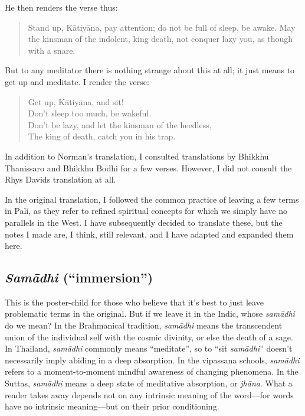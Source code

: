\documentclass[12pt,openany]{book}%
\begin{document}
He then renders the verse thus:

\begin{quotation}%
Stand up, \textsanskrit{Kātiyāna}, pay attention; do not be full of sleep, be awake. May the kinsman of the indolent, king death, not conquer lazy you, as though with a snare.

%
\end{quotation}

But to any meditator there is nothing strange about this at all; it just means to get up and meditate. I render the verse:

\begin{quotation}%
Get up, \textsanskrit{Kātiyāna}, and sit!\\

Don’t sleep too much, be wakeful.\\

Don’t be lazy, and let the kinsman of the heedless,\\

The king of death, catch you in his trap.

%
\end{quotation}

In addition to Norman’s translation, I consulted translations by Bhikkhu Thanissaro and Bhikkhu Bodhi for a few verses. However, I did not consult the Rhys Davids translation at all.

In the original translation, I followed the common practice of leaving a few terms in Pali, as they refer to refined spiritual concepts for which we simply have no parallels in the West. I have subsequently decided to translate these, but the notes I made are, I think, still relevant, and I have adapted and expanded them here.

\subsection*{\textit{\textsanskrit{Samādhi}} (“immersion”)}

This is the poster-child for those who believe that it’s best to just leave problematic terms in the original. But if we leave it in the Indic, whose \textit{\textsanskrit{samādhi}} do we mean? In the Brahmanical tradition, \textit{\textsanskrit{samādhi}} means the transcendent union of the individual self with the cosmic divinity, or else the death of a sage. In Thailand, \textit{\textsanskrit{samādhi}} commonly means “meditate”, so to “sit \textit{\textsanskrit{samādhi}}” doesn’t necessarily imply abiding in a deep absorption. In the vipassana schools, \textit{\textsanskrit{samādhi}} refers to a moment-to-moment mindful awareness of changing phenomena. In the Suttas, \textit{\textsanskrit{samādhi}} means a deep state of meditative absorption, or \textit{\textsanskrit{jhāna}}. What a reader takes away depends not on any intrinsic meaning of the word—for words have no intrinsic meaning—but on their prior conditioning.
\end{document}
